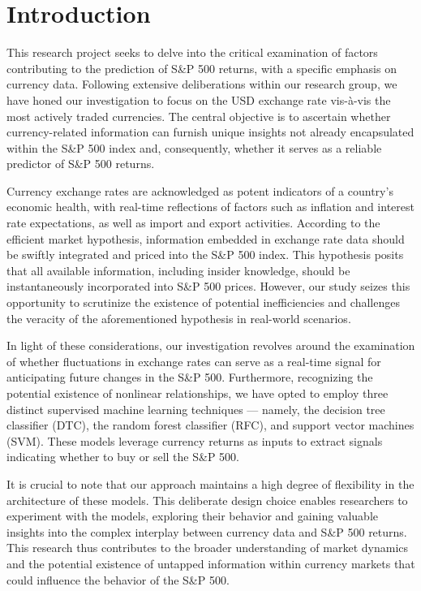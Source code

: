 \section{Introduction}
\label{Introduction}
This research project seeks to delve into the critical examination of factors contributing to the prediction of S\&P 500 returns, with a specific emphasis on currency data. Following extensive deliberations within our research group, we have honed our investigation to focus on the USD exchange rate vis-à-vis the most actively traded currencies. The central objective is to ascertain whether currency-related information can furnish unique insights not already encapsulated within the S\&P 500 index and, consequently, whether it serves as a reliable predictor of S\&P 500 returns.

Currency exchange rates are acknowledged as potent indicators of a country's economic health, with real-time reflections of factors such as inflation and interest rate expectations, as well as import and export activities. According to the efficient market hypothesis, information embedded in exchange rate data should be swiftly integrated and priced into the S\&P 500 index. This hypothesis posits that all available information, including insider knowledge, should be instantaneously incorporated into S\&P 500 prices. However, our study seizes this opportunity to scrutinize the existence of potential inefficiencies and challenges the veracity of the aforementioned hypothesis in real-world scenarios.

In light of these considerations, our investigation revolves around the examination of whether fluctuations in exchange rates can serve as a real-time signal for anticipating future changes in the S\&P 500. Furthermore, recognizing the potential existence of nonlinear relationships, we have opted to employ three distinct supervised machine learning techniques — namely, the decision tree classifier (\gls{DTC}), the random forest classifier (\gls{RFC}), and support vector machines (\gls{SVM}). These models leverage currency returns as inputs to extract signals indicating whether to buy or sell the S\&P 500.

It is crucial to note that our approach maintains a high degree of flexibility in the architecture of these models. This deliberate design choice enables researchers to experiment with the models, exploring their behavior and gaining valuable insights into the complex interplay between currency data and S\&P 500 returns. This research thus contributes to the broader understanding of market dynamics and the potential existence of untapped information within currency markets that could influence the behavior of the S\&P 500.

